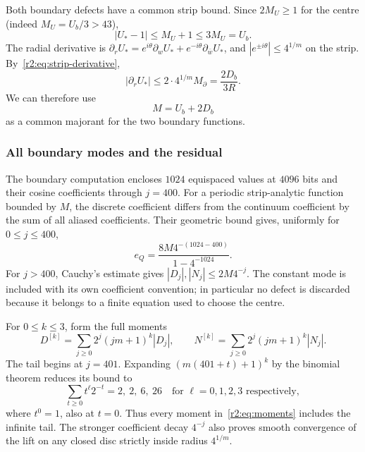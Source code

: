 Both boundary defects have a common strip bound. Since $2M_U\ge1$ for the centre (indeed $M_U=U_b/3>43$),
\[
 |U_*-1|\le M_U+1\le3M_U=U_b.
\]
The radial derivative is $\partial_rU_*=e^{i\theta}\partial_wU_*+e^{-i\theta}\partial_{\bar w}U_*$, and $|e^{\pm i\theta}|\le4^{1/m}$ on the strip. By~\eqref{r2:eq:strip-derivative},
\[
 |\partial_rU_*|\le2\cdot4^{1/m}M_\partial=\frac{2D_b}{3R}.
\]
We can therefore use
\begin{equation}\label{r2:eq:trace-M}
 M=U_b+2D_b
\end{equation}
as a common majorant for the two boundary functions.

\subsubsection{All boundary modes and the residual}
The boundary computation encloses $1024$ equispaced values at $4096$ bits and their cosine coefficients through $j=400$. For a periodic strip-analytic function bounded by $M$, the discrete coefficient differs from the continuum coefficient by the sum of all aliased coefficients. Their geometric bound gives, uniformly for $0\le j\le400$,
\begin{equation}\label{r2:eq:alias}
 e_Q=\frac{8M4^{-(1024-400)}}{1-4^{-1024}}.
\end{equation}
For $j>400$, Cauchy's estimate gives $|D_j|,|N_j|\le2M4^{-j}$. The constant mode is included with its own coefficient convention; in particular no defect is discarded because it belongs to a finite equation used to choose the centre.

For $0\le k\le3$, form the full moments
\begin{equation}\label{r2:eq:moments}
 D^{[k]}=\sum_{j\ge0}2^j(jm+1)^k|D_j|,
 \qquad N^{[k]}=\sum_{j\ge0}2^j(jm+1)^k|N_j|.
\end{equation}
The tail begins at $j=401$. Expanding $(m(401+t)+1)^k$ by the binomial theorem reduces its bound to
\begin{equation}\label{r2:eq:tail-sums}
 \sum_{t\ge0}t^\ell2^{-t}=2,\ 2,\ 6,\ 26\quad\text{for }\ell=0,1,2,3\text{ respectively},
\end{equation}
where $t^0=1$, also at $t=0$. Thus every moment in~\eqref{r2:eq:moments} includes the infinite tail. The stronger coefficient decay $4^{-j}$ also proves smooth convergence of the lift on any closed disc strictly inside radius $4^{1/m}$.


